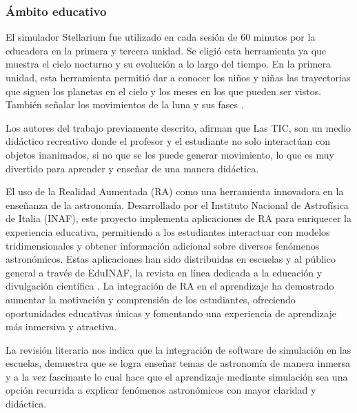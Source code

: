 \subsubsection*{Ámbito educativo}

El simulador Stellarium fue utilizado en cada sesión de 60 minutos por la educadora en la primera y tercera unidad. Se eligió esta herramienta ya que muestra el cielo nocturno y su evolución a lo largo del tiempo. En la primera unidad, esta herramienta permitió dar a conocer los niños y niñas las trayectorias que siguen los planetas en el cielo y los meses en los que pueden ser vistos. También señalar los movimientos de la luna y sus fases \cite{PerezLisboa2020}.

Los autores del trabajo previamente descrito, afirman que Las TIC, son un medio didáctico recreativo donde el profesor y el estudiante no solo interactúan con objetos inanimados, si no que se les puede generar movimiento, lo que es muy divertido para aprender y enseñar de una manera didáctica.

El uso de la Realidad Aumentada (RA) como una herramienta innovadora en la enseñanza de la astronomía. Desarrollado por el Instituto Nacional de Astrofísica de Italia (INAF), este proyecto implementa aplicaciones de RA para enriquecer la experiencia educativa, permitiendo a los estudiantes interactuar con modelos tridimensionales y obtener información adicional sobre diversos fenómenos astronómicos. Estas aplicaciones han sido distribuidas en escuelas y al público general a través de EduINAF, la revista en línea dedicada a la educación y divulgación científica \cite{nasa}. 
La integración de RA en el aprendizaje ha demostrado aumentar la motivación y comprensión de los estudiantes, ofreciendo oportunidades educativas únicas y fomentando una experiencia de aprendizaje más inmersiva y atractiva.

La revisión literaria nos indica que la integración de software de simulación en las escuelas, demuestra que se logra enseñar temas de astronomía de manera inmersa y a la vez fascinante lo cual hace
que el aprendizaje mediante simulación sea una opción recurrida a explicar fenómenos astronómicos con mayor claridad y didáctica.
